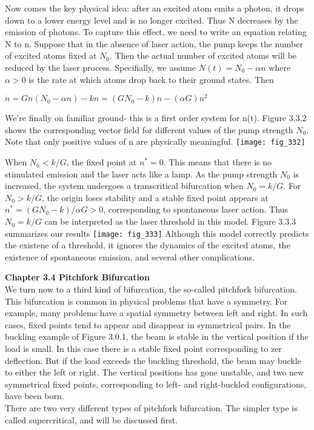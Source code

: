 \documentclass{article}
\newcommand\tab[1][1cm]{\hspace*{#1}}
\begin{document}
\tab Now comes the key physical idea: after an excited atom emits a photon, it drops down to a lower energy level and is no longer excited. Thus N decreases by the emission of photons. To capture this effect, we need to write an equation relating N to n. Suppose that in the absence of laser action, the pump keeps the number of excited atoms fixed at $N_{0}$. Then the actual number of excited atoms will be reduced by the laser process. Specifially, we assume 
\tab $N(t) = N_{0} - \alpha n$
where $\alpha > 0$ is the rate at which atoms drop back to their ground states. Then 
\begin{center}
$\dot{n} = Gn(N_{0}- \alpha n) - k n = (GN_{0} - k)n - (\alpha G) n^{2}$
\end{center}
We're finally on familiar ground- this is a first order system for n(t). Figure 3.3.2 shows the corresponding vector field for different  values of the pump strength $N_{0}$. Note that only positive values of n are physically meaningful.
\texttt{[image: fig\_332]}

When $N_{0}< k/G$, the fixed point at $n^{*}=0$. This means that there is no stimulated emission and the laser acts like a lamp. As the pump strength $N_{0}$ is increased, the system undergoes a transcritical bifurcation when $N_{0}=k/G$. For $N_{0} > k/G$, the origin loses stability and a stable fixed point appears at $n^{*}=(GN_{0}-k)/\alpha G>0$, corresponding to spontaneous laser action. Thus $N_{0} = k/G$ can be interpreted as the laser threshold in this model. Figure 3.3.3 summarizes our results
\texttt{[image: fig\_333]}
Although this model correctly predicts the existene of a threshold, it ignores the dynamics of the excited atoms, the existence of spontaneous emission, and several other complications.

\textbf {Chapter 3.4 Pitchfork Bifurcation} \\
We turn now to a third kind of bifurcation, the so-called pitchfork bifurcation. This bifurcation is common in physical problems that have a symmetry. For example, many problems have a spatial symmetry between left and right. In such cases, fixed points tend to appear and disappear in symmetrical pairs. In the buckling example of Figure 3.0.1, the beam is stable in the vertical position if the load is small. In this case there is a stable fixed point corresponding to zer deflection. But if the load exceeds the buckling threshold, the beam may buckle to either the left or right. The vertical positions has gone unstable, and two new symmetrical fixed points, corresponding to left- and right-buckled configurations, have been born. \\
\tab There are two very different types of pitchfork bifurcation. The simpler type is called supercritical, and will be discussed first. 
\end{document}
